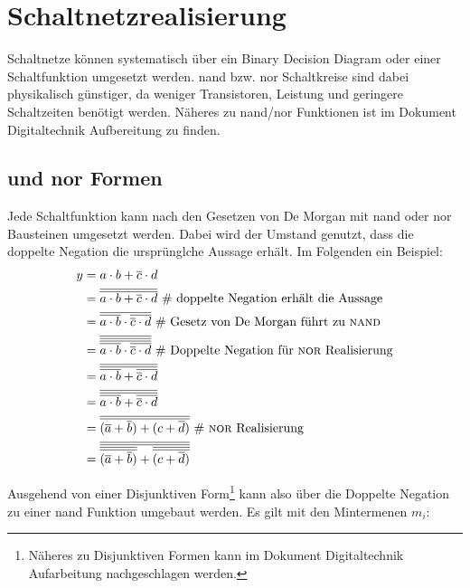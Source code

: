 
\chapter{Schaltnetzrealisierung}
Schaltnetze können systematisch über ein Binary Decision Diagram oder einer Schaltfunktion umgesetzt werden. 
{\sc nand} bzw. {\sc nor} Schaltkreise sind dabei physikalisch günstiger, da weniger Transistoren, Leistung und geringere Schaltzeiten benötigt werden. Näheres zu {\sc nand}/{\sc nor} Funktionen ist im Dokument Digitaltechnik Aufbereitung zu finden. 

\section{{} und {\sc nor} Formen}
Jede Schaltfunktion kann nach den Gesetzen von De Morgan mit {\sc nand} oder {\sc nor} Bausteinen umgesetzt werden. Dabei wird der Umstand genutzt, dass die doppelte Negation die ursprünglche Aussage erhält. Im Folgenden ein Beispiel:
\begin{align*}
y &= a \cdot b + \overline{c} \cdot d \\
  &= \overline{\overline{a \cdot b + \overline{c} \cdot d}} 
  	\textnormal{ \# doppelte Negation erhält die Aussage} \\
  &= \overline{\overline{a \cdot b} \cdot \overline{\overline{c} \cdot d}}
  \textnormal{ \# Gesetz von De Morgan führt zu {\sc nand}} \\
  &= \overline{\overline{\overline{\overline{a \cdot b} \cdot \overline{\overline{c} \cdot d}}}} 
  	\textnormal{ \# Doppelte Negation für {\sc nor} Realisierung} \\ 
  &= \overline{\overline{\overline{a \cdot b} + \overline{\overline{c} \cdot d}}} \\
  &= \overline{\overline{\overline{a \cdot b} + \overline{\overline{c} \cdot d}}} \\
  &= \overline{\overline{(\overline{a} + \overline{b}) + (c + \overline{d})}} \textnormal{ \# {\sc nor} Realisierung}\\
  &= \overline{\overline{\overline{\overline{(\overline{a} + \overline{b})}} 
  	+ \overline{\overline{(c + \overline{d})}}}} \\
\end{align*}

Ausgehend von einer Disjunktiven Form\footnote{Näheres zu Disjunktiven Formen kann im Dokument Digitaltechnik Aufarbeitung nachgeschlagen werden.} kann also über die Doppelte Negation zu einer {\sc nand} Funktion umgebaut werden. Es gilt mit den Mintermenen $m_i$:

